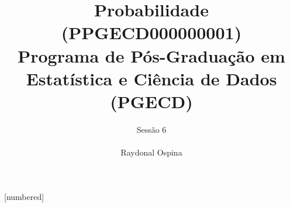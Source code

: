 \newcommand{\fullpage}[1]{
\begin{frame}
 #1
\end{frame}
}





[numbered]



\hypersetup{colorlinks,linkcolor=,urlcolor=links}


\graphicspath{{./graphics/}} 			%

\newcommand{\cor}[1]{ \{{#1}\}}


\title[Probabilidade]{  Probabilidade (PPGECD000000001) \\ \vspace{1cm}Programa de Pós-Graduação em Estatística e Ciência de Dados (PGECD) }
\author[ Raydonal Ospina 
\ ]{
	Sessão 6 \\
	${}$ \\
	Raydonal Ospina  }

\date[]{}







\begin{frame}
  \titlepage
\end{frame}


